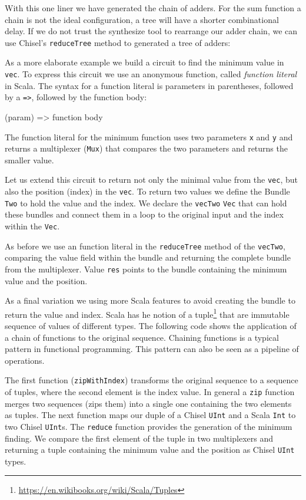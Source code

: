\documentclass[%
    10pt,
    headinclude, footexclude,
    openright, %
    notitlepage,
    cleardoubleempty,
    headsepline,
    pointlessnumbers,
    bibtotoc, idxtotoc,
    ]{scrbook}
\newcommand{\code}[1]{{\small{\texttt{#1}}}}
\newcommand{\myref}[2]{\href{#1}{#2}}
\renewcommand{\myref}[2]{{#2}{\footnote{\url{#1}}}}
\begin{document}
\noindent With this one liner we have generated the chain of adders. For the sum function
a chain is not the ideal configuration, a tree will have a shorter combinational delay.
If we do not trust the synthesize tool to rearrange our adder chain, we can use Chisel's
\code{reduceTree} method to generated a tree of adders:


As a more elaborate example we build a circuit to find the minimum value in \code{vec}. To express this circuit
we use an anonymous function, called \emph{function literal} in Scala.  The syntax for a function
literal is parameters in parentheses, followed by a \code{=>}, followed by the function body:

\begin{chisel}
  (param) => function body
\end{chisel}

\noindent The function literal for the minimum function uses two parameters \code{x} and \code{y}
and returns a multiplexer (\code{Mux}) that compares the two parameters and returns the smaller
value.


Let us extend this circuit to return not only the minimal value from the \code{vec}, but also the
position (index) in the \code{vec}. To return two values we define the Bundle \code{Two} to
hold the value and the index. We declare the \code{vecTwo} \code{Vec} that can hold these bundles
and connect them in a loop to the original input and the index within the \code{Vec}.

As before we use an function literal in the \code{reduceTree} method of the \code{vecTwo},
comparing the value field within the bundle and returning the complete bundle from the multiplexer.
Value \code{res} points to the bundle containing the minimum value and the position.


As a final variation we using more Scala features to avoid creating the bundle to return the value
and index. Scala has he notion of a \myref{https://en.wikibooks.org/wiki/Scala/Tuples}{tuple}
that are immutable sequence of values of different types. The following code shows the application
of a chain of functions to the original sequence. Chaining functions is a typical pattern in functional programming.
This pattern can also be seen as a pipeline of operations.

The first function (\code{zipWithIndex})
transforms the original sequence to a sequence of tuples, where the second element is the index
value. In general a \code{zip} function merges two sequences (zips them) into a single one
containing the two elements as tuples. The next function maps our duple of a Chisel \code{UInt}
and a Scala \code{Int} to two Chisel \code{UInt}s. The \code{reduce} function provides the generation of
the minimum finding. We compare the first element of the tuple in two multiplexers and returning
a tuple containing the minimum value and the position as Chisel \code{UInt} types.
\end{document}
